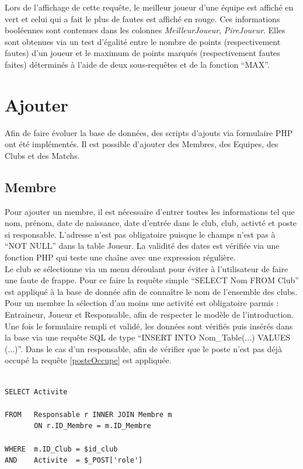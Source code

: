 \documentclass[a4paper»,8pt,french,fleqn]{report}
\begin{document}
Lors de l'affichage de cette requête, le meilleur joueur d'une équipe est affiché en vert et celui qui a fait le plus de fautes est affiché en rouge. Ces informations booléennes sont contenues dans les colonnes \textit{MeilleurJoueur}, \textit{PireJoueur}. Elles sont obtenues via un test d'égalité entre le nombre de points (respectivement fautes) d'un joueur et le maximum de points marqués (respectivement fautes faites) déterminés à l'aide de deux sous-requêtes et de la fonction ``MAX''.

\section{Ajouter}

Afin de faire évoluer la base de données, des scripts d'ajouts via formulaire PHP ont été implémentés. Il est possible d'ajouter des Membres, des Equipes, des Clubs et des Matchs.

\subsection{Membre}
Pour ajouter un membre, il est nécessaire d'entrer toutes les informations tel que nom, prénom, date de naissance, date d'entrée dans le club, club, activté et poste si responsable. L'adresse n'est pas obligatoire puisque le champs n'est pas à ``NOT NULL'' dans la table Joueur. La validité des dates est vérifiée via une fonction PHP qui teste une chaîne avec une expression régulière. \\

Le club se sélectionne via un menu déroulant pour éviter à l'utilisateur de faire une faute de frappe. Pour ce faire la requête simple ``SELECT Nom FROM Club'' est appliqué à la base de donnée afin de connaître le nom de l'ensemble des clubs. \\

 Pour un membre la sélection d'au moins une activité est obligatoire parmis : Entraineur, Joueur et Responsable, afin de respecter le modèle de l'introduction. Une fois le formulaire rempli et validé, les données sont vérifiés puis insérés dans la base via une requête SQL de type ``INSERT INTO Nom\_Table(...) VALUES (...)''. Dans le cas d'un responsable, afin de vérifier que le poste n'est pas déjà occupé la requête \ref{posteOccupe} est appliquée.

\begin{lstlisting}

SELECT Activite

FROM   Responsable r INNER JOIN Membre m
       ON r.ID_Membre = m.ID_Membre

WHERE  m.ID_Club = $id_club
AND    Activite  = $_POST['role']

\end{lstlisting}  
\end{document}
